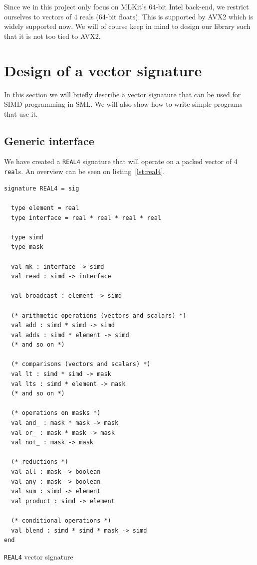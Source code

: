 \documentclass{article}
\begin{document}
Since we in this project only focus on MLKit's 64-bit Intel back-end, we restrict ourselves to vectors of 4 reals (64-bit floats). This is supported by AVX2 which is widely supported now. We will of course keep in mind to design our library such that it is not too tied to AVX2.

\section{Design of a vector signature}

In this section we will briefly describe a vector signature that can be used for SIMD programming in SML. We will also show how to write simple programs that use it.

\subsection{Generic interface}

We have created a \verb!REAL4! signature that will operate on a packed vector of 4 \verb!real!s. An overview can be seen on listing~\ref{lst:real4}.
\begin{listing}[ht]
\begin{verbatim}
signature REAL4 = sig

  type element = real
  type interface = real * real * real * real

  type simd
  type mask

  val mk : interface -> simd
  val read : simd -> interface

  val broadcast : element -> simd

  (* arithmetic operations (vectors and scalars) *)
  val add : simd * simd -> simd
  val adds : simd * element -> simd
  (* and so on *)

  (* comparisons (vectors and scalars) *)
  val lt : simd * simd -> mask
  val lts : simd * element -> mask
  (* and so on *)

  (* operations on masks *)
  val and_ : mask * mask -> mask
  val or_ : mask * mask -> mask
  val not_ : mask -> mask

  (* reductions *)
  val all : mask -> boolean
  val any : mask -> boolean
  val sum : simd -> element
  val product : simd -> element

  (* conditional operations *)
  val blend : simd * simd * mask -> simd
end
\end{verbatim}
\caption{\texttt{REAL4} vector signature}
\label{lst:real4}
\end{listing}
\end{document}
